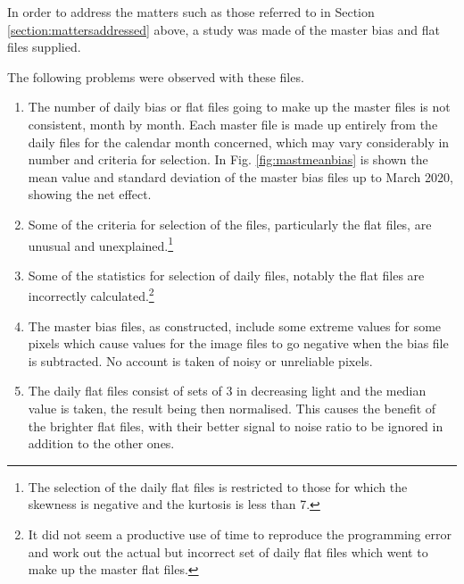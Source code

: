 In order to address the matters such as those referred to in Section
\ref{section:mattersaddressed} above, a study was made of the master bias and
flat files supplied.

The following problems were observed with these files.

\begin{enumerate}
  \item The number of daily bias or flat files going to make up the master files
  is not consistent, month by month. Each master file is made up entirely from
  the daily files for the calendar month concerned, which may vary considerably
  in number and criteria for selection. In Fig. \ref{fig:mastmeanbias} is shown
  the mean value and standard deviation of the master bias files up to March
  2020, showing the net effect.
  \item Some of the criteria for selection of the files, particularly the flat
  files, are unusual and unexplained.\footnote{The selection of the daily flat
  files is restricted to those for which the skewness is negative and the
  kurtosis is less than 7.}
  \item Some of the statistics for selection of daily files, notably the flat
  files are incorrectly calculated.\footnote{It did not seem a productive use of
  time to reproduce the programming error and work out the actual but incorrect
  set of daily flat files which went to make up the master flat files.}
  \item The master bias files, as constructed, include some extreme values for
  some pixels which cause values for the image files to go negative when the
  bias file is subtracted. No account is taken of noisy or unreliable pixels.
  \item The daily flat files consist of sets of 3 in decreasing light and the
  median value is taken, the result being then normalised. This causes the
  benefit of the brighter flat files, with their better signal to noise ratio to
  be ignored in addition to the other ones.
\end{enumerate}

